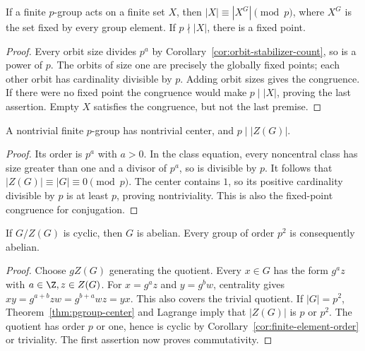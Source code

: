\begin{proposition}\label{prop:pgroup-fixed-points}
If a finite $p$-group acts on a finite set $X$, then
$|X|\equiv|X^G|\pmod p$, where $X^G$ is the set fixed by every group element. If $p\nmid|X|$, there is a fixed point.
\end{proposition}
\begin{proof}
Every orbit size divides $p^a$ by Corollary~\ref{cor:orbit-stabilizer-count}, so is a power of $p$. The orbits of size one are precisely the globally fixed points; each other orbit has cardinality divisible by $p$. Adding orbit sizes gives the congruence. If there were no fixed point the congruence would make $p\mid|X|$, proving the last assertion. Empty $X$ satisfies the congruence, but not the last premise.
\end{proof}

\begin{theorem}\label{thm:pgroup-center}
A nontrivial finite $p$-group has nontrivial center, and $p\mid|Z(G)|$.
\end{theorem}
\begin{proof}
Its order is $p^a$ with $a>0$. In the class equation, every noncentral class has size greater than one and a divisor of $p^a$, so is divisible by $p$. It follows that $|Z(G)|\equiv|G|\equiv0\pmod p$. The center contains $1$, so its positive cardinality divisible by $p$ is at least $p$, proving nontriviality. This is also the fixed-point congruence for conjugation.
\end{proof}

\begin{proposition}\label{prop:cyclic-central-quotient}
If $G/Z(G)$ is cyclic, then $G$ is abelian. Every group of order $p^2$ is consequently abelian.
\end{proposition}
\begin{proof}
Choose $gZ(G)$ generating the quotient. Every $x\in G$ has the form $g^az$ with $a\in\Z,z\in Z(G)$. For $x=g^az$ and $y=g^bw$, centrality gives $xy=g^{a+b}zw=g^{b+a}wz=yx$. This also covers the trivial quotient. If $|G|=p^2$, Theorem~\ref{thm:pgroup-center} and Lagrange imply that $|Z(G)|$ is $p$ or $p^2$. The quotient has order $p$ or one, hence is cyclic by Corollary~\ref{cor:finite-element-order} or triviality. The first assertion now proves commutativity.
\end{proof}

